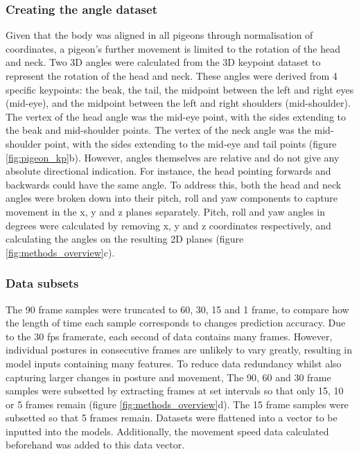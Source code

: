 \documentclass[11pt, letterpaper]{article} %
\begin{document}
        \subsubsection{Creating the angle dataset}
        Given that the body was aligned in all pigeons through normalisation of coordinates, a pigeon's further movement is limited to the rotation of the head and neck. Two 3D angles were calculated from the 3D keypoint dataset to represent the rotation of the head and neck. These angles were derived from 4 specific keypoints: the beak, the tail, the midpoint between the left and right eyes (mid-eye), and the midpoint between the left and right shoulders (mid-shoulder). The vertex of the head angle was the mid-eye point, with the sides extending to the beak and mid-shoulder points. The vertex of the neck angle was the mid-shoulder point, with the sides extending to the mid-eye and tail points (figure \ref{fig:pigeon_kp}b).
        However, angles themselves are relative and do not give any absolute directional indication. For instance, the head pointing forwards and backwards could have the same angle. To address this, both the head and neck angles were broken down into their pitch, roll and yaw components to capture movement in the x, y and z planes separately. Pitch, roll and yaw angles in degrees were calculated by removing x, y and z coordinates respectively, and calculating the angles on the resulting 2D planes (figure \ref{fig:methods_overview}c).

        \subsubsection{Data subsets}
        
        The 90 frame samples were truncated to 60, 30, 15 and 1 frame, to compare how the length of time each sample corresponds to changes prediction accuracy.
        Due to the 30 fps framerate, each second of data contains many frames. However, individual postures in consecutive frames are unlikely to vary greatly, resulting in model inputs containing many features. To reduce data redundancy whilst also capturing larger changes in posture and movement, The 90, 60 and 30 frame samples were subsetted by extracting frames at set intervals so that only 15, 10 or 5 frames remain (figure \ref{fig:methods_overview}d). The 15 frame samples were subsetted so that 5 frames remain.
        Datasets were flattened into a vector to be inputted into the models. Additionally, the movement speed data calculated beforehand was added to this data vector.
\end{document}
